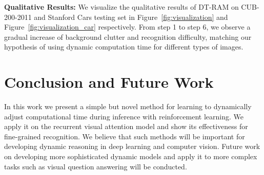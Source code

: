 \documentclass[10pt,twocolumn,letterpaper]{article}
\begin{document}


\textbf{Qualitative Results:} We visualize the qualitative results of DT-RAM on CUB-200-2011 and Stanford Cars testing set in Figure~\ref{fig:visualization} and Figure~\ref{fig:visualization_car} respectively.
From step 1 to step 6, we observe a gradual increase of background clutter and recognition difficulty, matching our hypothesis of using dynamic computation time for different types of images.


\section{Conclusion and Future Work}

In this work we present a simple but novel method for learning to dynamically adjust computational time during inference with reinforcement learning.
We apply it on the recurrent visual attention model and show its effectiveness for fine-grained recognition.
We believe that such methods will be important for developing dynamic reasoning in deep learning and computer vision.
Future work on developing more sophisticated dynamic models and apply it to more complex tasks such as visual question answering will be conducted.

{\small


}
\end{document}
